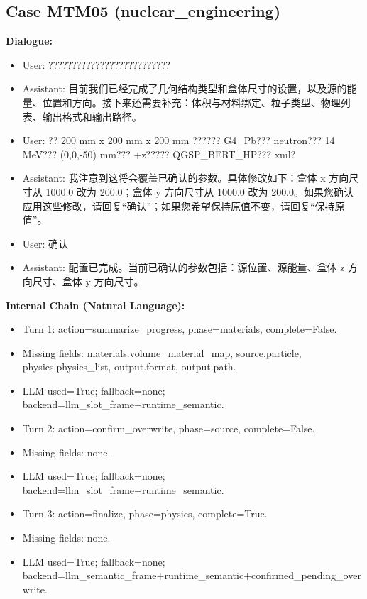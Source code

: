 \documentclass[11pt]{ctexart}
\begin{document}
\subsection{Case MTM05 (nuclear\_engineering)}
\textbf{Dialogue:}
\begin{itemize}
\item User: ??????????????????????????
\item Assistant: 目前我们已经完成了几何结构类型和盒体尺寸的设置，以及源的能量、位置和方向。接下来还需要补充：体积与材料绑定、粒子类型、物理列表、输出格式和输出路径。
\item User: ?? 200 mm x 200 mm x 200 mm ?????? G4\_Pb??? neutron??? 14 MeV??? (0,0,-50) mm??? +z????? QGSP\_BERT\_HP??? xml?
\item Assistant: 我注意到这将会覆盖已确认的参数。具体修改如下：盒体 x 方向尺寸从 1000.0 改为 200.0；盒体 y 方向尺寸从 1000.0 改为 200.0。如果您确认应用这些修改，请回复“确认”；如果您希望保持原值不变，请回复“保持原值”。
\item User: 确认
\item Assistant: 配置已完成。当前已确认的参数包括：源位置、源能量、盒体 z 方向尺寸、盒体 y 方向尺寸。
\end{itemize}
\textbf{Internal Chain (Natural Language):}
\begin{itemize}
\item Turn 1: action=summarize\_progress, phase=materials, complete=False.
\item Missing fields: materials.volume\_material\_map, source.particle, physics.physics\_list, output.format, output.path.
\item LLM used=True; fallback=none; backend=llm\_slot\_frame+runtime\_semantic.
\item Turn 2: action=confirm\_overwrite, phase=source, complete=False.
\item Missing fields: none.
\item LLM used=True; fallback=none; backend=llm\_slot\_frame+runtime\_semantic.
\item Turn 3: action=finalize, phase=physics, complete=True.
\item Missing fields: none.
\item LLM used=True; fallback=none; backend=llm\_semantic\_frame+runtime\_semantic+confirmed\_pending\_overwrite.
\end{itemize}
\end{document}

